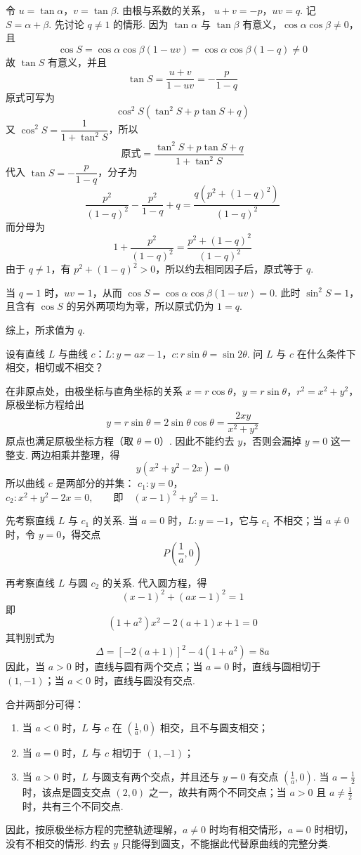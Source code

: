 \begin{solution}
令 \(u=\tan\alpha\)，\(v=\tan\beta\). 由根与系数的关系，
\(u+v=-p\)，\(uv=q\).
记 \(S=\alpha+\beta\). 先讨论 \(q\neq1\) 的情形. 因为 \(\tan\alpha\) 与 \(\tan\beta\) 有意义，\(\cos\alpha\cos\beta\neq0\)，且
\[
\cos S=\cos\alpha\cos\beta(1-uv)=\cos\alpha\cos\beta(1-q)\neq0
\]
故 \(\tan S\) 有意义，并且
\[
\tan S=\frac{u+v}{1-uv}=-\frac{p}{1-q}
\]
原式可写为
\[
\cos^2S\left(\tan^2S+p\tan S+q\right)
\]
又 \(\cos^2S=\dfrac{1}{1+\tan^2S}\)，所以
\[
\text{原式}=\frac{\tan^2S+p\tan S+q}{1+\tan^2S}
\]
代入 \(\tan S=-\dfrac{p}{1-q}\)，分子为
\[
\frac{p^2}{(1-q)^2}-\frac{p^2}{1-q}+q
=\frac{q\left(p^2+(1-q)^2\right)}{(1-q)^2}
\]
而分母为
\[
1+\frac{p^2}{(1-q)^2}=\frac{p^2+(1-q)^2}{(1-q)^2}
\]
由于 \(q\neq1\)，有 \(p^2+(1-q)^2>0\)，所以约去相同因子后，原式等于 \(q\).

当 \(q=1\) 时，\(uv=1\)，从而 \(\cos S=\cos\alpha\cos\beta(1-uv)=0\). 此时 \(\sin^2S=1\)，且含有 \(\cos S\) 的另外两项均为零，所以原式仍为 \(1=q\).

综上，所求值为 \(q\).
\end{solution}

\begin{problem}
设有直线 \(L\) 与曲线 \(c\)：\(L:y=ax-1\)，\(c:r\sin\theta=\sin2\theta\). 问 \(L\) 与 \(c\) 在什么条件下相交，相切或不相交？
\end{problem}

\begin{solution}
在非原点处，由极坐标与直角坐标的关系 \(x=r\cos\theta\)，\(y=r\sin\theta\)，\(r^2=x^2+y^2\)，原极坐标方程给出
\[
y=r\sin\theta=2\sin\theta\cos\theta=\frac{2xy}{x^2+y^2}
\]
原点也满足原极坐标方程（取 \(\theta=0\)）. 因此不能约去 \(y\)，否则会漏掉 \(y=0\) 这一整支. 两边相乘并整理，得
\[
y\left(x^2+y^2-2x\right)=0
\]
所以曲线 \(c\) 是两部分的并集：
\(c_1:y=0\)，\(c_2:x^2+y^2-2x=0,\qquad\text{即}\quad (x-1)^2+y^2=1\).

先考察直线 \(L\) 与 \(c_1\) 的关系. 当 \(a=0\) 时，\(L:y=-1\)，它与 \(c_1\) 不相交；当 \(a\neq0\) 时，令 \(y=0\)，得交点
\[
P\left(\frac1a,0\right)
\]

再考察直线 \(L\) 与圆 \(c_2\) 的关系. 代入圆方程，得
\[
(x-1)^2+(ax-1)^2=1
\]
即
\[
(1+a^2)x^2-2(a+1)x+1=0
\]
其判别式为
\[
\Delta=\left[-2(a+1)\right]^2-4(1+a^2)=8a
\]
因此，当 \(a>0\) 时，直线与圆有两个交点；当 \(a=0\) 时，直线与圆相切于 \((1,-1)\)；当 \(a<0\) 时，直线与圆没有交点.

合并两部分可得：
\begin{enumerate}
\item 当 \(a<0\) 时，\(L\) 与 \(c\) 在 \(\left(\frac1a,0\right)\) 相交，且不与圆支相交；
\item 当 \(a=0\) 时，\(L\) 与 \(c\) 相切于 \((1,-1)\)；
\item 当 \(a>0\) 时，\(L\) 与圆支有两个交点，并且还与 \(y=0\) 有交点 \(\left(\frac1a,0\right)\). 当 \(a=\frac12\) 时，该点是圆支交点 \((2,0)\) 之一，故共有两个不同交点；当 \(a>0\) 且 \(a\neq\frac12\) 时，共有三个不同交点.
\end{enumerate}
因此，按原极坐标方程的完整轨迹理解，\(a\neq0\) 时均有相交情形，\(a=0\) 时相切，没有不相交的情形. 约去 \(y\) 只能得到圆支，不能据此代替原曲线的完整分类.
\end{solution}

